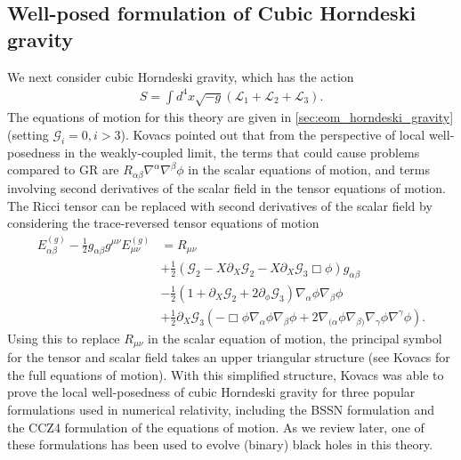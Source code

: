 \documentclass{ws-ijmpd}
\begin{document}
\subsection{Well-posed formulation of Cubic Horndeski gravity
\label{sec:cubic_horndeksi_gravity_well_posedness}
}
We next consider cubic Horndeski gravity, which has the action
\begin{align}
   S=
   \int d^4x\sqrt{-g}\left(
      \mathcal{L}_1
      +
      \mathcal{L}_2
      +
      \mathcal{L}_3
   \right)
   .
\end{align}
The equations of motion for this theory are 
given in \ref{sec:eom_horndeski_gravity}
(setting $\mathcal{G}_i=0,i>3$).
Kovacs\cite{Kovacs:2019jqj} pointed out that from the perspective of
local well-posedness in the weakly-coupled limit, 
the terms that could cause problems compared to GR are
$R_{\alpha\beta}\nabla^{\alpha}\nabla^{\beta}\phi$ in the scalar
equations of motion, and terms involving second derivatives of the
scalar field in the tensor equations of motion.
The Ricci tensor can be replaced with second derivatives
of the scalar field by considering the trace-reversed tensor
equations of motion
\begin{align}
   E_{\alpha\beta}^{(g)}
   -
   \frac{1}{2}g_{\alpha\beta}g^{\mu\nu}E_{\mu\nu}^{(g)}
   &=
   R_{\mu\nu}
   \nonumber\\&+
   \frac{1}{2}\left(
      \mathcal{G}_2
      -
      X\partial_X\mathcal{G}_2
      -
      X\partial_X\mathcal{G}_3\Box\phi
   \right)
   g_{\alpha\beta}
   \nonumber\\&-
   \frac{1}{2}\left(
      1
      +
      \partial_X\mathcal{G}_2
      +
      2\partial_{\phi}\mathcal{G}_3
   \right)
   \nabla_{\alpha}\phi\nabla_{\beta}\phi
   \nonumber\\&+
   \frac{1}{2}\partial_X\mathcal{G}_3\left(
      -
      \Box\phi\nabla_{\alpha}\phi\nabla_{\beta}\phi
      +
      2\nabla_{(\alpha}\phi\nabla_{\beta)}\nabla_{\gamma}\phi\nabla^{\gamma}\phi
   \right)
   .
\end{align}
Using this to replace $R_{\mu\nu}$ in the scalar equation of motion,
the principal symbol for the tensor and scalar field takes an upper
triangular structure
(see Kovacs\cite{Kovacs:2019jqj} for the full equations of motion).
With this simplified structure, 
Kovacs was able to prove the local well-posedness of
cubic Horndeski gravity for three popular formulations used in
numerical relativity, 
including the BSSN formulation\cite{Shibata:1995we,Baumgarte:1998te}
and the CCZ4 formulation\cite{Bona:2003fj,Alic:2011gg} 
of the equations of motion.
As we review later, one of these formulations has been used
to evolve (binary) black holes in this 
theory\cite{Figueras:2020dzx,Figueras:2021abd}.
\end{document}
